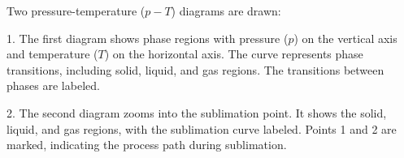 Two pressure-temperature (\(p-T\)) diagrams are drawn:  

1. The first diagram shows phase regions with pressure (\(p\)) on the vertical axis and temperature (\(T\)) on the horizontal axis. The curve represents phase transitions, including solid, liquid, and gas regions. The transitions between phases are labeled.  

2. The second diagram zooms into the sublimation point. It shows the solid, liquid, and gas regions, with the sublimation curve labeled. Points 1 and 2 are marked, indicating the process path during sublimation.